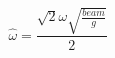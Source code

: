 \begin{equation} \label{eq:omega_hat_equation}
\hat{\omega} = \frac{\sqrt{2} \omega \sqrt{\frac{beam}{g}}}{2}
\end{equation}
